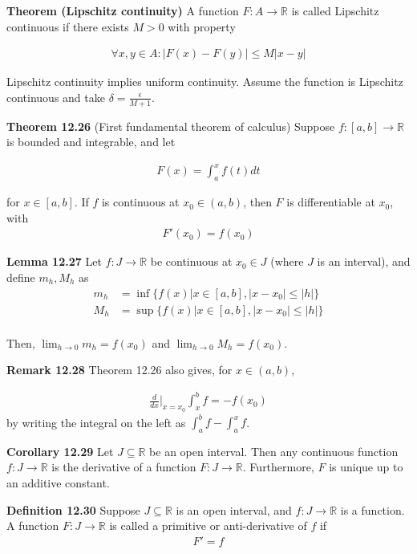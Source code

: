 \documentclass[11pt]{article}
\begin{document}
\textbf{Theorem (Lipschitz continuity)} A function $F:A \to \mathbb{R}$ is called Lipschitz continuous if there exists $M > 0$ with property 

\begin{align*}
    \forall x,y \in A: |F(x) - F(y)| \leq M|x-y| 
\end{align*}

Lipschitz continuity implies uniform continuity. Assume the function is Lipschitz continuous and take $\delta = \frac{\epsilon}{M+1}$.

\textbf{Theorem 12.26} (First fundamental theorem of calculus) Suppose $f:[a,b] \to \mathbb{R}$ is bounded and integrable, and let 

\begin{align*}
    F(x) = \int_a^x f(t) dt
\end{align*}

for $x \in [a,b]$. If $f$ is continuous at $x_0 \in (a,b)$, then $F$ is differentiable at $x_0$, with 
\begin{align*}
    F'(x_0) = f(x_0)
\end{align*}

\textbf{Lemma 12.27} Let $f: J \to \mathbb{R}$ be continuous at $x_0 \in J$ (where $J$ is an interval), and define $m_h, M_h$ as 
\begin{align*}
    m_h &= \inf \{f(x) | x \in [a,b], |x-x_0| \leq |h| \} \\
    M_h &= \sup \{f(x) | x \in [a,b], |x-x_0| \leq |h| \} \\
\end{align*}

Then, $\lim_{h \to 0} m_h = f(x_0)$ and $\lim_{h \to 0} M_h = f(x_0)$.

\textbf{Remark 12.28} Theorem 12.26 also gives, for $x \in (a,b)$, 

\begin{align*}
    \frac{d}{dx} \Big|_{x=x_0} \int_x^b f = -f(x_0)
\end{align*}
by writing the integral on the left as $\int_a^b f - \int_a^x f$.

\textbf{Corollary 12.29} Let $J \subseteq \mathbb{R}$ be an open interval. Then any continuous function $f: J \to \mathbb{R}$ is the derivative of a function $F: J \to \mathbb{R}$. Furthermore, $F$ is unique up to an additive constant.

\textbf{Definition 12.30} Suppose $J \subseteq \mathbb{R}$ is an open interval, and $f: J \to \mathbb{R}$ is a function. A function $F: J \to \mathbb{R}$ is called a primitive or anti-derivative of $f$ if 
\begin{align*}
    F' = f
\end{align*}
\end{document}
